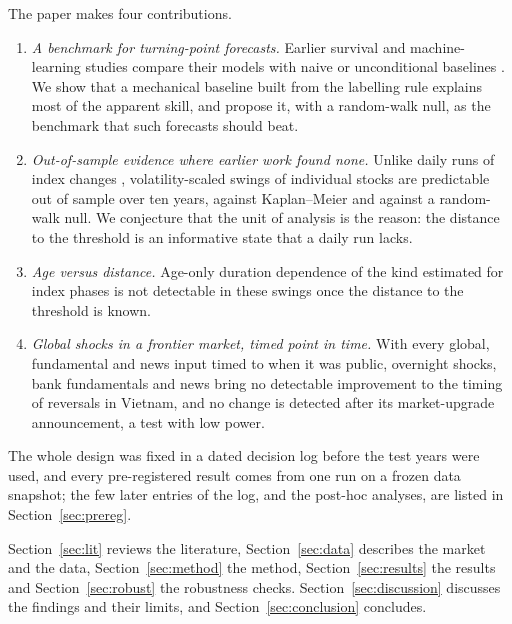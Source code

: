 The paper makes four contributions.
\begin{enumerate}
\item \emph{A benchmark for turning-point forecasts.} Earlier survival and machine-learning studies
  compare their models with naive or unconditional baselines
  \citep{Yao2005,AdegboyeKampouridis2021,HuZhou2024}. We show that a mechanical baseline built from
  the labelling rule explains most of the apparent skill, and propose it, with a random-walk null,
  as the benchmark that such forecasts should beat.
\item \emph{Out-of-sample evidence where earlier work found none.} Unlike daily runs of index changes
  \citep{Yao2005}, volatility-scaled swings of individual stocks are predictable out of sample over
  ten years, against Kaplan--Meier and against a random-walk null. We conjecture that the unit of analysis is the reason: the distance to the threshold
  is an informative state that a daily run lacks.
\item \emph{Age versus distance.} Age-only duration dependence of the kind estimated for index phases
  \citep{LundeTimmermann2004,Zakamulin2023} is not detectable in these swings once the distance to
  the threshold is known.
\item \emph{Global shocks in a frontier market, timed point in time.} With every global, fundamental
  and news input timed to when it was public, overnight shocks, bank fundamentals and news bring no
  detectable improvement to the timing of reversals in Vietnam, and no change is detected after its
  market-upgrade announcement, a test with low power.
\end{enumerate}
The whole design was fixed in a dated decision log before the test years were used, and every
pre-registered result comes from one run on a frozen data snapshot; the few later entries of the
log, and the post-hoc analyses, are listed in Section~\ref{sec:prereg}.

Section~\ref{sec:lit} reviews the literature, Section~\ref{sec:data} describes the market and the
data, Section~\ref{sec:method} the method, Section~\ref{sec:results} the results and
Section~\ref{sec:robust} the robustness checks. Section~\ref{sec:discussion} discusses the
findings and their limits, and Section~\ref{sec:conclusion} concludes.
